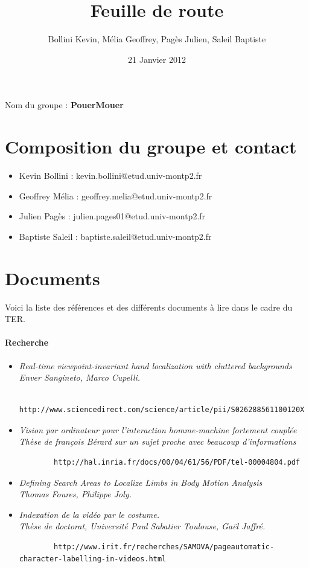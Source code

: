 \documentclass{article}
\title{Feuille de route}
\author{Bollini Kevin, Mélia Geoffrey, Pagès Julien, Saleil Baptiste}
\date{21 Janvier 2012}
\begin{document}
\maketitle
	Nom du groupe : \textbf{PouerMouer}
	\section{Composition du groupe et contact}
	
	\begin{itemize}
	\item Kevin Bollini : kevin.bollini@etud.univ-montp2.fr \\
	\item Geoffrey Mélia : geoffrey.melia@etud.univ-montp2.fr \\
	\item Julien Pagès : julien.pages01@etud.univ-montp2.fr \\
	\item Baptiste Saleil : baptiste.saleil@etud.univ-montp2.fr \\
	\end{itemize} 	

\section{Documents}
	Voici la liste des références et des différents documents à lire dans le cadre du TER. 

	\paragraph{Recherche}
	\begin{itemize}
		\item \it{Real-time viewpoint-invariant hand localization with cluttered backgrounds} \\
		Enver Sangineto, Marco Cupelli.
		\begin{verbatim}
		http://www.sciencedirect.com/science/article/pii/S026288561100120X
		\end{verbatim}
		\item \it{Vision par ordinateur pour l’interaction homme-machine fortement couplée}\\
		Thèse de françois Bérard sur un sujet proche avec beaucoup d'informations
		\begin{verbatim}
		http://hal.inria.fr/docs/00/04/61/56/PDF/tel-00004804.pdf
		\end{verbatim}
		\item \it{Defining Search Areas to Localize Limbs in Body Motion Analysis} \\
		Thomas Foures, Philippe Joly.
		\item \it{Indexation de la vidéo par le costume.}\\ 
		Thèse de doctorat, Université Paul Sabatier Toulouse, Gaël Jaffré.
		\begin{verbatim}
		http://www.irit.fr/recherches/SAMOVA/pageautomatic-character-labelling-in-videos.html
		\end{verbatim}
	\end{itemize}
\end{document}
